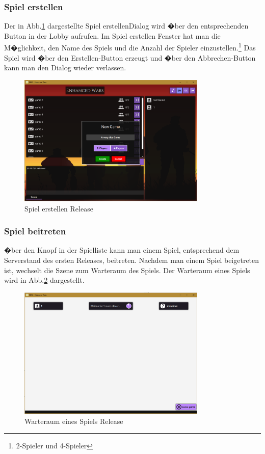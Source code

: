 \documentclass[12pt, titlepage]{scrartcl}
\newcommand{\RN}[1]{%
	\textup{\uppercase\expandafter{\romannumeral#1}}%
}
\begin{document}
		\subsubsection{Spiel erstellen}
		Der in Abb.\ref{CreateGame_Release_One} dargestellte \glqq Spiel erstellen\grqq Dialog wird �ber den entsprechenden Button in der Lobby aufrufen. Im Spiel erstellen Fenster hat man die M�glichkeit, den Name des Spiels und die Anzahl der Spieler einzustellen.\footnote{2-Spieler und 4-Spieler} Das Spiel wird �ber den \glqq Erstellen\grqq-Button erzeugt und �ber den \glqq Abbrechen\grqq-Button kann man den Dialog wieder verlassen.
		\begin{figure}[H] 
			\centering
			\includegraphics[width=0.8\textwidth]{CreateGame_Release_One.PNG}
			\caption{Spiel erstellen Release \RN{1}}
			\label{CreateGame_Release_One}
		\end{figure}
		\subsubsection{Spiel beitreten}
		�ber den Knopf in der Spielliste kann man einem Spiel, entsprechend dem Serverstand des ersten Releases, beitreten. Nachdem man einem Spiel beigetreten ist, wechselt die Szene zum Warteraum des Spiels. Der Warteraum eines Spiels wird in Abb.\ref{WaitingRoom_Release_One} dargestellt.
		 \begin{figure}[H] 
		 	\centering
		 	\includegraphics[width=0.8\textwidth]{WaitingRoom_Release_One.PNG}
		 	\caption{Warteraum eines Spiels Release \RN{1}}
		 	\label{WaitingRoom_Release_One}
		 \end{figure}
\end{document}
